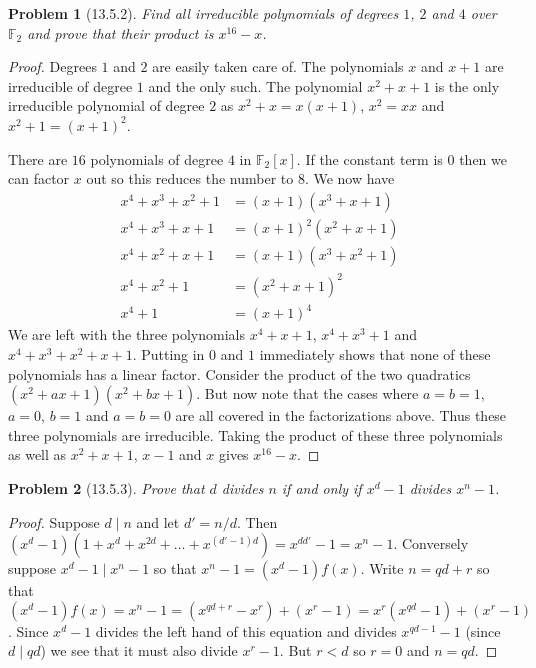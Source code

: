 \documentclass{article}
\newtheorem{problem}{Problem}
\begin{document}
\begin{problem}[13.5.2]
Find all irreducible polynomials of degrees $1$, $2$ and $4$ over $\mathbb{F}_2$ and prove that their product is $x^{16}-x$.
\end{problem}
\begin{proof}
Degrees $1$ and $2$ are easily taken care of. The polynomials $x$ and $x+1$ are irreducible of degree $1$ and the only such. The polynomial $x^2 + x + 1$ is the only irreducible polynomial of degree $2$ as $x^2 + x = x(x+1)$, $x^2 = xx$ and $x^2 + 1 = (x+1)^2$.

There are $16$ polynomials of degree $4$ in $\mathbb{F}_2[x]$. If the constant term is $0$ then we can factor $x$ out so this reduces the number to $8$. We now have
\begin{align*}
x^4 + x^3 + x^2 + 1 &= (x+1)(x^3 + x + 1)\\
x^4 + x^3 + x + 1 &= (x+1)^2(x^2 + x + 1)\\
x^4 + x^2 + x + 1 &= (x+1)(x^3 + x^2 + 1)\\
x^4 + x^2 + 1 &= (x^2 + x + 1)^2\\
x^4 + 1 &= (x+1)^4
\end{align*}
We are left with the three polynomials $x^4 + x + 1$, $x^4 + x^3 + 1$ and $x^4 + x^3 + x^2 + x + 1$. Putting in $0$ and $1$ immediately shows that none of these polynomials has a linear factor. Consider the product of the two quadratics $(x^2 + ax + 1)(x^2 + bx + 1)$. But now note that the cases where $a = b = 1$, $a = 0$, $b = 1$ and $a = b = 0$ are all covered in the factorizations above. Thus these three polynomials are irreducible. Taking the product of these three polynomials as well as $x^2 + x + 1$, $x - 1$ and $x$ gives $x^{16} - x$.
\end{proof}

\begin{problem}[13.5.3]
Prove that $d$ divides $n$ if and only if $x^d - 1$ divides $x^n - 1$.
\end{problem}
\begin{proof}
Suppose $d \mid n$ and let $d' = n/d$. Then $(x^d - 1)(1 + x^d + x^{2d} + \dots + x^{(d'-1)d}) = x^{dd'} - 1 = x^n - 1$. Conversely suppose $x^d - 1 \mid x^n - 1$ so that $x^n - 1 = (x^d - 1)f(x)$. Write $n = qd + r$ so that $(x^d - 1)f(x) = x^n - 1 = (x^{qd + r} - x^r) + (x^r - 1) = x^r(x^{qd} - 1) + (x^r - 1)$. Since $x^d-1$ divides the left hand of this equation and divides $x^{qd-1} - 1$ (since $d \mid qd$) we see that it must also divide $x^r - 1$. But $r < d$ so $r = 0$ and $n = qd$.
\end{proof}
\end{document}
